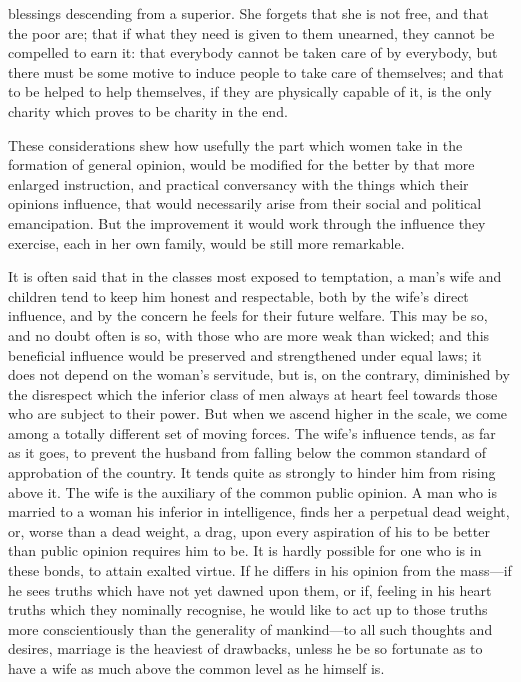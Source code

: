 \documentclass[12pt]{report}
\begin{document}
blessings descending from a superior. She forgets that she is not free, and that the poor are; that if what they need is given to them unearned, they cannot be compelled to earn it: that everybody cannot be taken care of by everybody, but there must be some motive to induce people to take care of themselves; and that to be helped to help themselves, if they are physically capable of it, is the only charity which proves to be charity in the end.

These considerations shew how usefully the part which women take in the formation of general opinion, would be modified for the better by that more enlarged instruction, and practical conversancy with the things which their opinions influence, that would necessarily arise from their social and political emancipation. But the improvement it would work through the influence they exercise, each in her own family, would be still more remarkable.

It is often said that in the classes most exposed to temptation, a man's wife and children tend to keep him honest and respectable, both by the wife's direct influence, and by the concern he feels for their future welfare. This may be so, and no doubt often is so, with those who are more weak than wicked; and this beneficial influence would be preserved and strengthened under equal laws; it does not depend on the woman's servitude, but is, on the contrary, diminished by the disrespect which the inferior class of men always at heart feel towards those who are subject to their power. But when we ascend higher in the scale, we come among a totally different set of moving forces. The wife's influence tends, as far as it goes, to prevent the husband from falling below the common standard of approbation of the country. It tends quite as strongly to hinder him from rising above it. The wife is the auxiliary of the common public opinion. A man who is married to a woman his inferior in intelligence, finds her a perpetual dead weight, or, worse than a dead weight, a drag, upon every aspiration of his to be better than public opinion requires him to be. It is hardly possible for one who is in these bonds, to attain exalted virtue. If he differs in his opinion from the mass—if he sees truths which have not yet dawned upon them, or if, feeling in his heart truths which they nominally recognise, he would like to act up to those truths more conscientiously than the generality of mankind—to all such thoughts and desires, marriage is the heaviest of drawbacks, unless he be so fortunate as to have a wife as much above the common level as he himself is.
\end{document}
